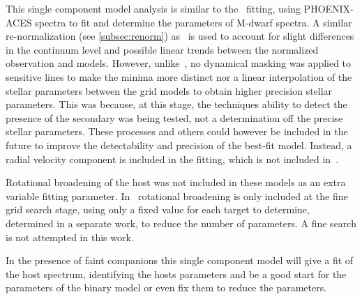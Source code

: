 This single component model analysis is similar to the~\citet{passegger_fundamental_2016} \textchisquared{} fitting, using {PHOENIX-ACES} spectra to fit and determine the parameters of {M-dwarf} spectra.
A similar re-normalization (see \cref{subsec:renorm}) as~\citet{passegger_fundamental_2016} is used to account for slight differences in the continuum level and possible linear trends between the normalized observation and models.
However, unlike~\citet{passegger_fundamental_2016}, no dynamical masking was applied to sensitive lines to make the \textchisquared{} minima more distinct nor a linear interpolation of the stellar parameters between the grid models to obtain higher precision stellar parameters.
This was because, at this stage, the techniques ability to detect the presence of the secondary was being tested, not a determination off the precise stellar parameters.
These processes and others could however be included in the future to improve the detectability and precision of the best-fit model.
Instead, a radial velocity component is included in the \textchisquared{} fitting, which is not included in~\citet{passegger_fundamental_2016}.

Rotational broadening of the host was not included in these models as an extra variable fitting  parameter.
In~\citet{passegger_carmenes_2018} rotational broadening is only included at the fine grid search stage, using only a fixed value for each target to determine, determined in a separate work, to reduce the number of parameters.
A fine search is not attempted in this work.

In the presence of faint companions this single component model will give a fit of the host spectrum, identifying the hosts parameters and be a good start for the parameters of the binary model or even fix them to reduce the parameters.

